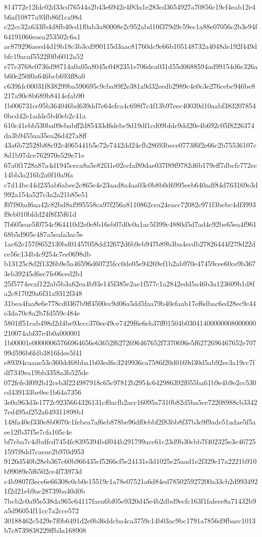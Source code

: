 {814772e12fdc02d33cd76544a2b43e6942e4f83a1e283cd3654927a70856c19cf4eab12e4b6af10877a93fb86f1ca98d
c22cc32a633fb4d8fb40cd1f0ab3a80008e2c952abd10f379d9c59ec1a88e07056c2b3e94f64191066eaea253502c6a1
ac879296aeed4d19b18c3b3cd990115d3aac81760dc9e66b105148732a4048de192f449dbfc19acaf5522f0fb6012a52
e77c3768c0736d98714a0a05a8045c0482351e706dca031d55d0688594ad99154d6c326ab60e250f0a646bcb693ff8a0
c639fdc00031f838299ba590695c9cba89f2e381a9d32eedb2989c4e0c3e276cebc946be8217a90c8b689b8414efab90
1b006731ce95b364046bd639dd7e64efca4c698f7c4f13b97eec40039d10aabf3832078540bcd42e1adde5b40eb2c41a
610c41ebb530ba09ebabff2d85433d6debc9d19df1cd09bfdc9dd20e4b692c05f8226374da3b9455aa35ea26d427a8ff
43a6b72528b88c92c4065441b5e72e7442dd24cfb28693bece0773f6f2e66c2b75536107c8d1b97dce762970e529e71e
67a0f1728a87a4d1945ceca8a5e82f31e02ccfaf89dae037f89f9782d6b179eff7dbcfc772ec14bb3a216b2a0f10a9fa
c7d14bc44d235ab6abee2c865e4e23aad8a4aa03c0b8b0d6995eeb640adf84d763169e3d992a154a527c3a2a21b85e51
f07f80ad6aa42c82bd8af995558ca97f256a8110862cea24eacc72082c971f3bebc4df3993f9eb010bfdd24f8f35f61d
7b605eae5f0754c964410d2e0e8b16eb07d0c0a1ac5f399c4880d5d7ad4c92be65ea4f96168b5d905c487a5eafa3ac5e
1ac62e157f8652130bd01457058dd32672d6b9eb947b89b3ba4ecdb27826444f279d22dce56c134b4c9254c7ee0698db
b13125c8d2f1326b9e5a46596d60725fcc0de05e94269ef1b2ab970e47459cee60ce9b3673eb39245d6ec7fe06ced2b1
25f5774ecaf122ab5b3a62ea4b93e145f385e2ae1f577c1a2842edd5a46b3a123609b1d8fa2c817029a6f31a9312f348
31bea4faa8e6e778cd0367b9ff4500cc9d06a5dd5faa79b40efaab17ef6dbac6ed28ec9c44e3da70c8a2b7fd559c484e
5801ff51cab498d2d4be93ccc370ee49ce7429f6e6eb37ff01504b03041400000008000000210074abf37e4b0a000001
1b00001e00000065766964656e63652f6272696467652f7370696e5f6272696467652e70799d596b6fdb3816fdee5f41
e89394caaae53c360dd68bba1b03ed6c3249936ca7586f20d0169d30d5ab92ec3a19cc7fdf7349ea19bb3358a3b525de
072fefe3f092b12ceb3f224987918c65c97812b2954c642986392f055ba61b9e4b9e2cc530cd439133be0ec1b64a7356
3e0a963d3e1772c9235664326131cf0acfb2acc16095a7310b82d5ba5ce72208988cb33427ed495af252a649311898b1
148fa40ef330e8b0070c1febea7af6eb878be96df0ebbf2f83bb8f37b3e9f9ade51adae5f5aee12fb37f5e7cfa105c4e
bf7eba7c4dbdfcd7454fc8395394b4f044b291799acc61c23d9b30cbb7f402325e3e467251597f8dd7caeae2b970d953
9126d540b28eb367c60b966435cf5266cf5e24131e3d1025e25aad1e2f329e17a2221b910b99089e5f6502ce4f73973d
c4b9807f3ece6e66308c0cb0e15519c1a78e07521a6d84ed785025927200a33cb2d9934921f2d21eb9ac28739ba40d0b
7bcb2c0a95e538da965c64117faea6bf05e9320d45e4b2dbd9ecfc163f1fafeee8a71432b9a5d96054f11cc7a2cce572
30188462c5429e7f0b6491d2e0b36ddcba4ca3759c14b03ac9bc1791a7856d9fbaec1013b7c8739838229ffb3a168908
}
